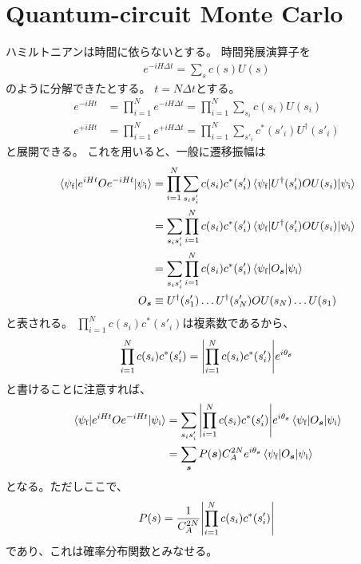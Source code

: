 \documentclass[]{ltjsarticle}
\newcommand{\vs}{\bm{s}}
\begin{document}
\section{Quantum-circuit Monte Carlo}
ハミルトニアンは時間に依らないとする。
時間発展演算子を
\begin{align}
    e^{-iH \Delta t} = \sum_{s} c(s) U(s)
\end{align}   
のように分解できたとする。
$t = N\Delta t$とする。
\begin{align}
    e^{-iHt}
    &=
    \prod_{i=1}^N e^{-iH \Delta t}
    =
    \prod_{i=1}^N \sum_{s_i} c(s_i) U(s_i) \\
    e^{+iHt}
    &=
    \prod_{i=1}^N e^{+iH \Delta t}
    =
    \prod_{i=1}^N \sum_{s'_i} c^*(s'_i) U^\dagger(s'_i)
\end{align}   
と展開できる。
これを用いると、一般に遷移振幅は
\begin{align}
    \mel{\psi_\text{f}}{e^{iHt}Oe^{-iHt}}{\psi_\text{i}}
    &=
    \prod_{i=1}^N
    \sum_{s_i s'_i} c(s_i) c^*(s'_i)
    \mel{\psi_\text{f}}{U^\dagger(s'_i) O U(s_i)}{\psi_\text{i}} \\
    &=
    \sum_{s_i s'_i}
    \prod_{i=1}^N
    c(s_i) c^*(s'_i)
    \mel{\psi_\text{f}}{U^\dagger(s'_i) O U(s_i)}{\psi_\text{i}} \\
    &=
    \sum_{s_i s'_i}
    \prod_{i=1}^N
    c(s_i) c^*(s'_i)
    \mel{\psi_\text{f}}{O_{\vs}}{\psi_\text{i}} \\
    O_{\vs} 
    &\equiv
    U^\dagger(s'_1) \dots U^\dagger(s'_N)
    O
    U(s_N) \dots U(s_1)
\end{align}   
と表される。
$\prod_{i=1}^N c(s_i) c^*(s'_i)$は複素数であるから、
\begin{align}
    \prod_{i=1}^N c(s_i) c^*(s'_i)
    =
    \qty|
        \prod_{i=1}^N c(s_i)c^*(s'_i)
    |
    e^{i\theta_{\vs}}
\end{align}       
と書けることに注意すれば、
\begin{align}
    \mel{\psi_\text{f}}{e^{iHt}Oe^{-iHt}}{\psi_\text{i}}
    &=
    \sum_{s_i s'_i}
    \qty|
        \prod_{i=1}^N c(s_i)c^*(s'_i)
    |
    e^{i\theta_{\vs}}
    \mel{\psi_\text{f}}{O_{\vs}}{\psi_\text{i}} \\
    &=
    \sum_{\vs}
    P(\vs)
    C_A^{2N}
    e^{i\theta_{\vs}}
    \mel{\psi_\text{f}}{O_{\vs}}{\psi_\text{i}}
\end{align}
となる。ただしここで、
\begin{align}
    P(s)
    =
    \frac{1}{C_A^{2N}}
    \qty|
        \prod_{i=1}^N c(s_i)c^*(s'_i)
    |
\end{align}
であり、これは確率分布関数とみなせる。
\end{document}
